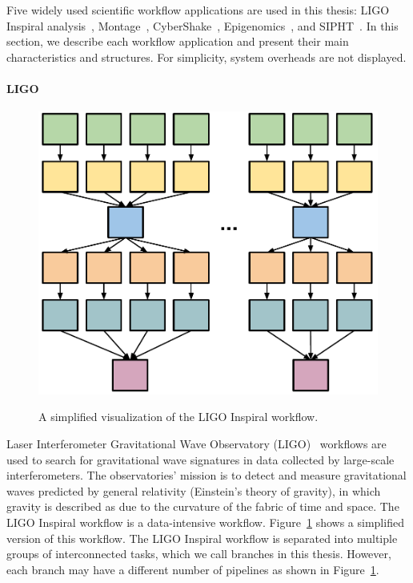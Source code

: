 Five widely used scientific workflow applications are used in this thesis: LIGO Inspiral analysis~\cite{LIGO}, Montage~\cite{Berriman2004}, CyberShake~\cite{Graves2010}, Epigenomics~\cite{Epigenome}, and SIPHT~\cite{SIPHT}. In this section, we describe each workflow application and present their main characteristics and structures. For simplicity, system overheads are not displayed.

\paragraph{\textbf{LIGO}}
\begin{figure}[!htb]
	\centering
	\includegraphics[width=0.45\linewidth]{figures/workflowsim/ligo_shape.pdf} \\
	\caption{A simplified visualization of the LIGO Inspiral workflow.}
	\label{fig:model_shape_ligo}
\end{figure}
Laser Interferometer Gravitational Wave Observatory (LIGO)~\cite{LIGO} workflows are used to search for gravitational wave signatures in data collected by large-scale interferometers. The observatories' mission is to detect and measure gravitational waves predicted by general relativity (Einstein's theory of gravity), in which gravity is described as due to the curvature of the fabric of time and space. The LIGO Inspiral workflow is a data-intensive workflow. Figure~\ref{fig:model_shape_ligo} shows a simplified version of this workflow. The LIGO Inspiral workflow is separated into multiple groups of interconnected tasks, which we call branches in this thesis. However, each branch may have a different number of pipelines as shown in Figure~\ref{fig:model_shape_ligo}. 

